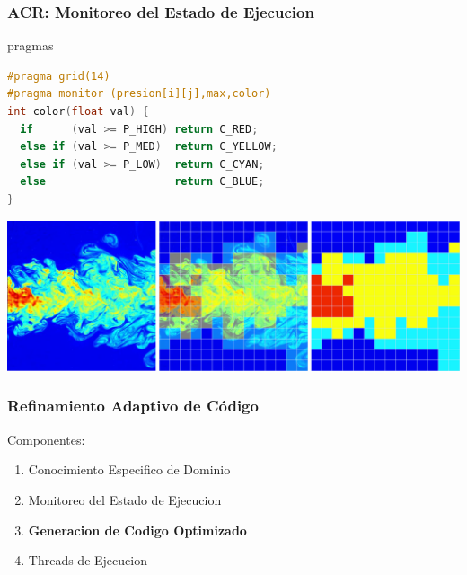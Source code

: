 \documentclass{beamer}\usetheme{Madrid} %
\begin{document}
\begin{frame}[fragile]
\frametitle{ACR: Monitoreo del Estado de Ejecucion}
\begin{block}{pragmas}
\begin{lstlisting}[basicstyle=\scriptsize,language=C]
#pragma grid(14) 
#pragma monitor (presion[i][j],max,color)
int color(float val) {
  if      (val >= P_HIGH) return C_RED; 
  else if (val >= P_MED)  return C_YELLOW;
  else if (val >= P_LOW)  return C_CYAN;
  else                    return C_BLUE;
}
\end{lstlisting}
\end{block}
\begin{center}
\includegraphics[scale=0.20]{img/turbulent_legal.png} \\
\end{center}
\end{frame}
\begin{frame}
\frametitle{Refinamiento Adaptivo de Código}
Componentes:
\begin{enumerate}
\item Conocimiento Especifico de Dominio
\item Monitoreo del Estado de Ejecucion
\item \textbf{Generacion de Codigo Optimizado}
\item Threads de Ejecucion
\end{enumerate}
\end{frame}
\end{document}
